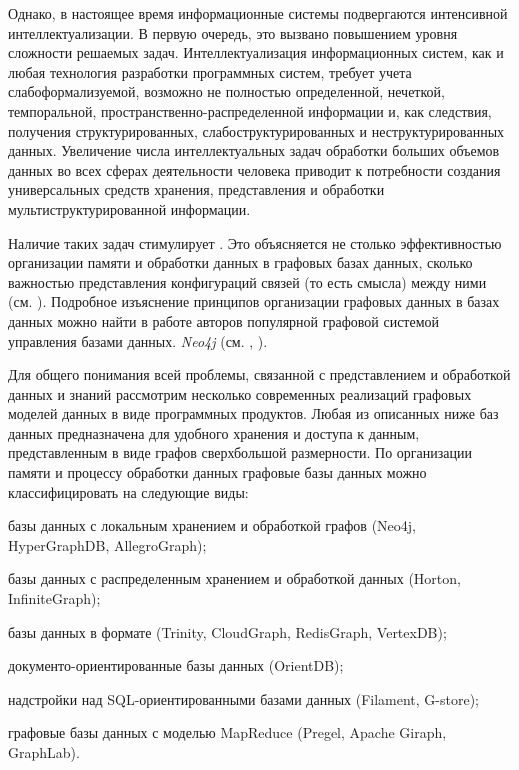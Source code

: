 Однако, в настоящее время информационные системы подвергаются интенсивной интеллектуализации. В первую очередь, это вызвано повышением уровня сложности решаемых задач. Интеллектуализация информационных систем, как и любая технология разработки программных систем, требует учета слабоформализуемой, возможно не полностью определенной, нечеткой, темпоральной, пространственно-распределенной информации и, как следствия, получения структурированных, слабоструктурированных и неструктурированных данных. Увеличение числа интеллектуальных задач обработки больших объемов данных во всех сферах деятельности человека приводит к потребности создания универсальных средств хранения, представления и обработки мультиструктурированной информации.

Наличие таких задач стимулирует . Это объясняется не столько эффективностью организации памяти и обработки данных в графовых базах данных, сколько важностью представления конфигураций связей (то есть смысла) между ними (см. ). Подробное изъяснение принципов организации графовых данных в базах данных можно найти в работе авторов популярной графовой системой управления базами данных. \textit{Neo4j} (см. , ).

Для общего понимания всей проблемы, связанной с представлением и обработкой данных и знаний рассмотрим несколько современных реализаций графовых моделей данных в виде программных продуктов. Любая из описанных ниже баз данных предназначена для удобного хранения и доступа к данным, представленным в виде графов сверхбольшой размерности. По организации памяти и процессу обработки данных графовые базы данных можно классифицировать на следующие виды:
\begin{textitemize}
    \item базы данных с локальным хранением и обработкой графов (Neo4j, HyperGraphDB, AllegroGraph);
    \item базы данных с распределенным хранением и обработкой данных (Horton, InfiniteGraph);
    \item базы данных в формате  (Trinity, CloudGraph, RedisGraph, VertexDB);
    \item документо-ориентированные базы данных (OrientDB);
    \item надстройки над SQL-ориентированными базами данных (Filament, G-store);
    \item графовые базы данных с моделью MapReduce (Pregel, Apache Giraph, GraphLab).
\end{textitemize}

